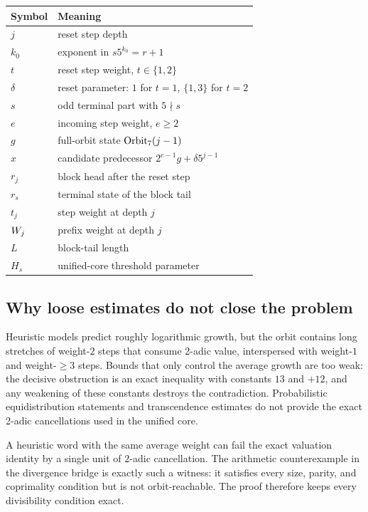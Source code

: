 \begin{center}
\small
\begin{tabular}{@{}p{}p{}@{}}
\toprule
Symbol & Meaning \\
\midrule
$j$ & reset step depth \\
$k_0$ & exponent in $s5^{k_0}=r+1$ \\
$t$ & reset step weight, $t\in\{1,2\}$ \\
$\delta$ & reset parameter: $1$ for $t=1$, $\{1,3\}$ for $t=2$ \\
$s$ & odd terminal part with $5\nmid s$ \\
$e$ & incoming step weight, $e\ge2$ \\
$g$ & full-orbit state $\mathrm{Orbit}_7(j-1)$ \\
$x$ & candidate predecessor $2^{e-1}g+\delta5^{j-1}$ \\
$r_j$ & block head after the reset step \\
$r_s$ & terminal state of the block tail \\
$t_j$ & step weight at depth $j$ \\
$W_j$ & prefix weight at depth $j$ \\
$L$ & block-tail length \\
$H_s$ & unified-core threshold parameter \\
\bottomrule
\end{tabular}
\end{center}

\subsection{Why loose estimates do not close the problem}

Heuristic models predict roughly logarithmic growth, but the orbit
contains long stretches of weight-$2$ steps that consume 2-adic value,
interspersed with weight-$1$ and weight-$\ge3$ steps.  Bounds that only
control the average growth are too weak: the decisive obstruction is an
exact inequality with constants $13$ and $+12$, and any weakening of
these constants destroys the contradiction.  Probabilistic equidistribution
statements and transcendence estimates do not provide the exact
2-adic cancellations used in the unified core.

A heuristic word with the same average weight can fail the exact
valuation identity by a single unit of 2-adic cancellation.  The
arithmetic counterexample in the divergence bridge is exactly such a
witness: it satisfies every size, parity, and coprimality condition
but is not orbit-reachable.  The proof therefore keeps every
divisibility condition exact.
